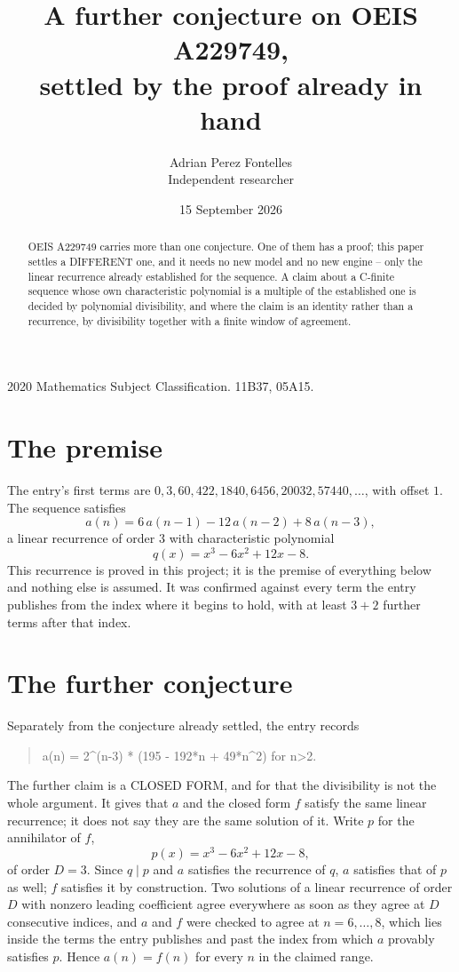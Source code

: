 \documentclass[11pt,a4paper]{article}
\title{A further conjecture on OEIS A229749,\\ \large settled by the proof already in hand}
\author{Adrian Perez Fontelles\\ \small Independent researcher}
\date{15 September 2026}
\theoremstyle{plain}
\theoremstyle{definition}
\begin{document}
\maketitle

\begin{abstract}
OEIS A229749 carries more than one conjecture. One of them has a proof; this paper settles a
DIFFERENT one, and it needs no new model and no new engine -- only the linear recurrence already
established for the sequence. A claim about a C-finite sequence whose own characteristic
polynomial is a multiple of the established one is decided by polynomial divisibility, and where
the claim is an identity rather than a recurrence, by divisibility together with a finite window
of agreement.
\end{abstract}

\noindent\small 2020 Mathematics Subject Classification. 11B37, 05A15.\normalsize

\section{The premise}

The entry's first terms are $0, 3, 60, 422, 1840, 6456, 20032, 57440,\dots$, with offset $1$. The sequence satisfies
\[
  a(n)=6\,a(n-1) - 12\,a(n-2) + 8\,a(n-3) ,
\]
a linear recurrence of order $3$ with characteristic polynomial
\[
  q(x)=x^{3} - 6 x^{2} + 12 x - 8 .
\]
This recurrence is proved in this project; it is the premise of everything below and nothing else is assumed.
It was confirmed against every term the entry publishes from the index where it begins to hold,
with at least $3+2$ further terms after that index.

\section{The further conjecture}

Separately from the conjecture already settled, the entry records

\begin{quote}\raggedright a(n) = 2\^{}(n-3) * (195 - 192*n + 49*n\^{}2) for n>2.\end{quote}

The further claim is a CLOSED FORM, and for that the divisibility is not the whole argument. It
gives that $a$ and the closed form $f$ satisfy the same linear recurrence; it does not say they
are the same solution of it. Write $p$ for the annihilator of $f$,
\[
  p(x)=x^{3} - 6 x^{2} + 12 x - 8 ,
\]
of order $D=3$. Since $q\mid p$ and $a$ satisfies the recurrence of $q$, $a$ satisfies that of
$p$ as well; $f$ satisfies it by construction. Two solutions of a linear recurrence of order $D$
with nonzero leading coefficient agree everywhere as soon as they agree at $D$ consecutive
indices, and $a$ and $f$ were checked to agree at $n=6,\dots,8$,
which lies inside the terms the entry publishes and past the index from which $a$ provably
satisfies $p$. Hence $a(n)=f(n)$ for every $n$ in the claimed range.
\end{document}
